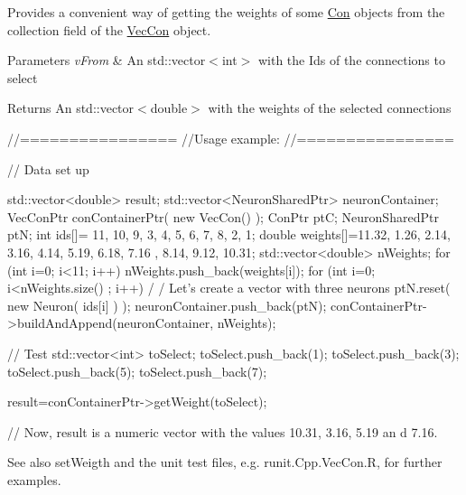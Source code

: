 Provides a convenient way of getting the weights of some \hyperlink{class_con}{Con} objects from the collection field of the \hyperlink{classvec_con}{VecCon} object.


\begin{DoxyParams}{Parameters}
{\em vFrom} & An std::vector$<$int$>$ with the Ids of the connections to select\\
\hline
\end{DoxyParams}
\begin{DoxyReturn}{Returns}
An std::vector$<$double$>$ with the weights of the selected connections
\end{DoxyReturn}

\begin{DoxyCode}
        //================
        //Usage example:
        //================

        // Data set up

                std::vector<double> result;
                std::vector<NeuronSharedPtr> neuronContainer;
                VecConPtr conContainerPtr( new VecCon() );
                ConPtr    ptC;
                NeuronSharedPtr ptN;
                int ids[]= {11, 10, 9, 3, 4, 5, 6, 7, 8, 2, 1};
                double weights[]={11.32, 1.26, 2.14, 3.16, 4.14, 5.19, 6.18, 7.16
      , 8.14, 9.12, 10.31};
                std::vector<double> nWeights;
                for (int i=0; i<11; i++) {
                        nWeights.push_back(weights[i]);
                }
                for (int i=0; i<nWeights.size() ; i++) {                         /
      / Let's create a vector with three neurons
                        ptN.reset( new Neuron( ids[i] ) );
                        neuronContainer.push_back(ptN);
                }
                conContainerPtr->buildAndAppend(neuronContainer, nWeights);

        // Test
                std::vector<int> toSelect;
                toSelect.push_back(1);
                toSelect.push_back(3);
                toSelect.push_back(5);
                toSelect.push_back(7);

                result=conContainerPtr->getWeight(toSelect);

        // Now, result is a numeric vector with the values  10.31, 3.16,  5.19 an
      d 7.16.
\end{DoxyCode}


\begin{DoxySeeAlso}{See also}
setWeigth and the unit test files, e.g. runit.Cpp.VecCon.R, for further examples. 
\end{DoxySeeAlso}


